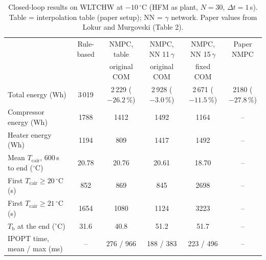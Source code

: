 \begin{table}[t]
\centering
\caption{Closed-loop results on WLTCHW at $-10\,^{\circ}$C (HFM as plant, $N=30$, $\Delta t=1$\,s). Table = interpolation table (paper setup); NN = $\gamma$ network. Paper values from Lokur and Murgovski (Table 2).}
\label{tab:nmpc_WLTCHW_minus10C}
\begin{tabular}{l ccccc}
\toprule
 & Rule-based & NMPC, table & NMPC, NN 11\,$\gamma$ & NMPC, NN 15\,$\gamma$ & Paper NMPC \\
 &  & original COM & original COM & fixed COM &  \\
\midrule
Total energy (Wh) & 3\,019 & 2\,229 ($-26.2$\,\%) & 2\,928 ($-3.0$\,\%) & 2\,671 ($-11.5$\,\%) & 2180 ($-27.8$\,\%) \\
Compressor energy (Wh) & 1788 & 1412 & 1492 & 1164 & -- \\
Heater energy (Wh) & 1194 & 809 & 1417 & 1492 & -- \\
Mean $T_{\mathrm{cair}}$, 600\,s to end ($^{\circ}$C) & 20.78 & 20.76 & 20.61 & 18.70 & -- \\
First $T_{\mathrm{cair}}\geq 20\,^{\circ}$C (s) & 852 & 869 & 845 & 2698 & -- \\
First $T_{\mathrm{cair}}\geq 21\,^{\circ}$C (s) & 1654 & 1080 & 1124 & 3223 & -- \\
$T_{\mathrm{b}}$ at the end ($^{\circ}$C) & 31.6 & 40.8 & 51.2 & 51.7 & -- \\
IPOPT time, mean / max (ms) & -- & 276 / 966 & 188 / 383 & 223 / 496 & -- \\
\bottomrule
\end{tabular}
\end{table}
